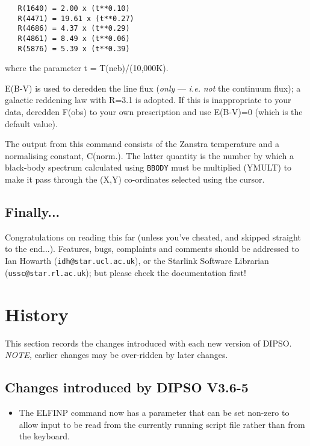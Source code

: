 \documentclass[twoside,11pt]{article}
\newcommand{\htmlref}[2]{#1}
\renewcommand{\_}{\texttt{\symbol{95}}}
\begin{document}
\begin {description}
\begin{verbatim}
   R(1640) = 2.00 x (t**0.10)
   R(4471) = 19.61 x (t**0.27)
   R(4686) = 4.37 x (t**0.29)
   R(4861) = 8.49 x (t**0.06)
   R(5876) = 5.39 x (t**0.39)
\end{verbatim}

where the parameter t = T(neb)/(10,000K).

E(B-V) is used to deredden the line flux ({\em only} --- {\em i.e.}
{\em not} the continuum flux); a galactic reddening law with R=3.1 is
adopted. If this is inappropriate to your data, deredden F(obs) to
your own prescription and use E(B-V)=0 (which is the default value).

The output from this command consists of the Zanstra temperature and a
normalising constant, C(norm.). The latter quantity is the number by
which a black-body spectrum calculated using \htmlref{{\tt{BBODY}}}{COM:BBODY}  must be multiplied
(YMULT) to make it pass through the (X,Y) co-ordinates selected using
the cursor.

\end{description}

\subsection{Finally...}
Congratulations on reading this far (unless you've cheated, and skipped
straight to the end...). Features, bugs, complaints and comments should
be addressed to Ian Howarth ({\tt{idh@star.ucl.ac.uk}}),  or the Starlink
Software Librarian ({\tt{ussc@star.rl.ac.uk}});  but please check the
documentation first!

\newpage

\section{\label{APP:HISTORY}History}


This section records the changes introduced with each new version of DIPSO.
{\em NOTE,} earlier changes may be over-ridden by later changes.

\subsection{Changes introduced by DIPSO V3.6-5}
\begin{itemize}
\item The ELFINP command now has a parameter that can be set non-zero to
allow input to be read from the currently running script file rather than
from the keyboard.
\end{itemize}
\end{document}
